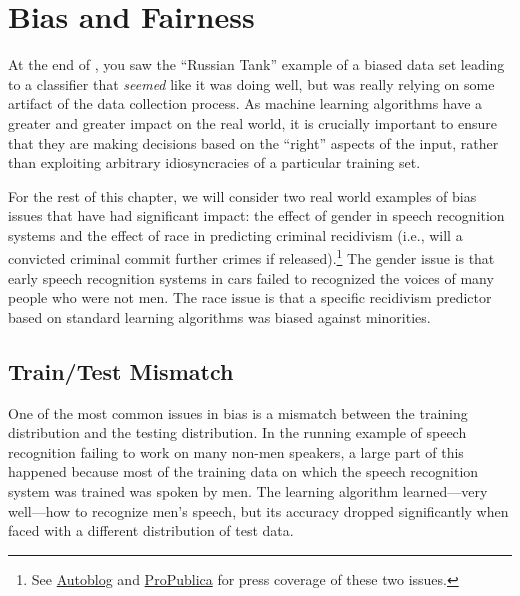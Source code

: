 \chapter{Bias and Fairness} \label{sec:bias}


\begin{learningobjectives}
\item 
\end{learningobjectives}




At the end of , you saw the ``Russian Tank'' example of a biased data set leading to a classifier that \emph{seemed} like it was doing well, but was really relying on some artifact of the data collection process.
As machine learning algorithms have a greater and greater impact on the real world, it is crucially important to ensure that they are making decisions based on the ``right'' aspects of the input, rather than exploiting arbitrary idiosyncracies of a particular training set.

For the rest of this chapter, we will consider two real world examples of bias issues that have had significant impact: the effect of gender in speech recognition systems and the effect of race in predicting criminal recidivism (i.e., will a convicted criminal commit further crimes if released).\footnote{See \href{http://www.autoblog.com/2011/05/31/women-voice-command-systems/}{Autoblog} and \href{http://www.propublica.org/article/machine-bias-risk-assessments-in-criminal-sentencing}{ProPublica} for press coverage of these two issues.} The gender issue is that early speech recognition systems in cars failed to recognized the voices of many people who were not men. The race issue is that a specific recidivism predictor based on standard learning algorithms was biased against minorities.

\section{Train/Test Mismatch}

One of the most common issues in bias is a mismatch between the training distribution and the testing distribution.
In the running example of speech recognition failing to work on many non-men speakers, a large part of this happened because most of the training data on which the speech recognition system was trained was spoken by men.
The learning algorithm learned---very well---how to recognize men's speech, but its accuracy dropped significantly when faced with a different distribution of test data.

